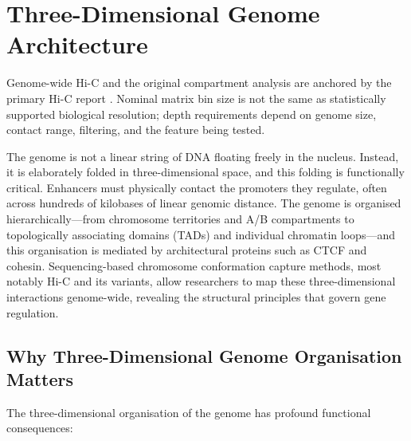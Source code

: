 \chapter{Three-Dimensional Genome Architecture}
\label{ch:3dgenome}

\begin{sourcebox}
Genome-wide Hi-C and the original compartment analysis are anchored by the primary Hi-C report \cite{lieberman2009}. Nominal matrix bin size is not the same as statistically supported biological resolution; depth requirements depend on genome size, contact range, filtering, and the feature being tested.
\end{sourcebox}

\begin{keyconcept}
The genome is not a linear string of DNA floating freely in the nucleus. Instead, it is elaborately folded in three-dimensional space, and this folding is functionally critical. Enhancers must physically contact the promoters they regulate, often across hundreds of kilobases of linear genomic distance. The genome is organised hierarchically---from chromosome territories and A/B compartments to topologically associating domains (TADs) and individual chromatin loops---and this organisation is mediated by architectural proteins such as CTCF and cohesin. Sequencing-based chromosome conformation capture methods, most notably Hi-C and its variants, allow researchers to map these three-dimensional interactions genome-wide, revealing the structural principles that govern gene regulation.
\end{keyconcept}

\section{Why Three-Dimensional Genome Organisation Matters}
\label{sec:3dgenome:why}

The three-dimensional organisation of the genome has profound functional consequences:

